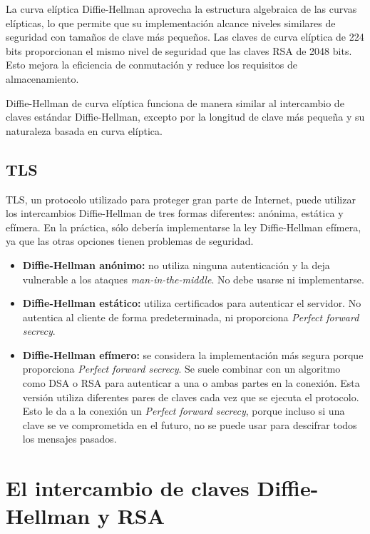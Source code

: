 \documentclass[11pt]{article}
\begin{document}
La curva elíptica Diffie-Hellman aprovecha la estructura algebraica de las curvas elípticas, lo que permite que su implementación alcance niveles similares de seguridad con tamaños de clave más pequeños. Las claves de curva elíptica de 224 bits proporcionan el mismo nivel de seguridad que las claves RSA de 2048 bits. Esto mejora la eficiencia de conmutación y reduce los requisitos de almacenamiento.

Diffie-Hellman de curva elíptica funciona de manera similar al intercambio de claves estándar Diffie-Hellman, excepto por la longitud de clave más pequeña y su naturaleza basada en curva elíptica.
\\
\subsection{TLS}

TLS, un protocolo utilizado para proteger gran parte de Internet, puede utilizar los intercambios Diffie-Hellman de tres formas diferentes: anónima, estática y efímera. En la práctica, sólo debería implementarse la ley Diffie-Hellman efímera, ya que las otras opciones tienen problemas de seguridad.


\begin{itemize}
    \item \textbf{Diffie-Hellman anónimo:} no utiliza ninguna autenticación y la deja vulnerable a los ataques \emph{man-in-the-middle}. No debe usarse ni implementarse.
    \item \textbf{Diffie-Hellman estático:} utiliza certificados para autenticar el servidor. No autentica al cliente de forma predeterminada, ni proporciona \emph{Perfect forward secrecy}.
    \item \textbf{Diffie-Hellman efímero:} se considera la implementación más segura porque proporciona \emph{Perfect forward secrecy}. Se  suele combinar con un algoritmo como DSA o RSA para autenticar a una o ambas partes en la conexión. Esta versión utiliza diferentes pares de claves cada vez que se ejecuta el protocolo. Esto le da a la conexión un \emph{Perfect forward secrecy}, porque incluso si una clave se ve comprometida en el futuro, no se puede usar para descifrar todos los mensajes pasados.\\
\end{itemize}



\newpage

\section{El intercambio de claves Diffie-Hellman y RSA}
\end{document}
